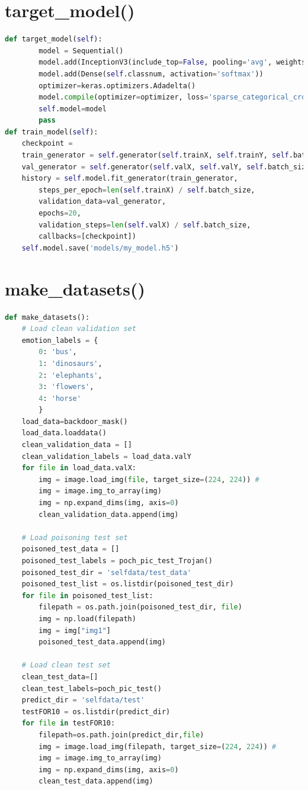 \documentclass[english,version-2022-01]{uzl-thesis}
\begin{document}
\section{target\_model()}
\label{target_model()}
\begin{lstlisting}[language=Python]
def target_model(self):
        model = Sequential()
        model.add(InceptionV3(include_top=False, pooling='avg', weights='imagenet'))
        model.add(Dense(self.classnum, activation='softmax'))
        optimizer=keras.optimizers.Adadelta()
        model.compile(optimizer=optimizer, loss='sparse_categorical_crossentropy', metrics=['accuracy'])
        self.model=model
        pass
def train_model(self):
    checkpoint = 
    train_generator = self.generator(self.trainX, self.trainY, self.batch_size, train_action=True)
    val_generator = self.generator(self.valX, self.valY, self.batch_size, train_action=False)
    history = self.model.fit_generator(train_generator,
        steps_per_epoch=len(self.trainX) / self.batch_size,
        validation_data=val_generator,
        epochs=20,
        validation_steps=len(self.valX) / self.batch_size,
        callbacks=[checkpoint])
    self.model.save('models/my_model.h5')
\end{lstlisting}

\section{make\_datasets()}
\label{make_datasets()}
\begin{lstlisting}[language=Python]
def make_datasets():
    # Load clean validation set
    emotion_labels = {
        0: 'bus',
        1: 'dinosaurs',
        2: 'elephants',
        3: 'flowers',
        4: 'horse'
        }
    load_data=backdoor_mask()
    load_data.loaddata()
    clean_validation_data = []
    clean_validation_labels = load_data.valY
    for file in load_data.valX:
        img = image.load_img(file, target_size=(224, 224)) #
        img = image.img_to_array(img) 
        img = np.expand_dims(img, axis=0)
        clean_validation_data.append(img)

    # Load poisoning test set
    poisoned_test_data = []
    poisoned_test_labels = poch_pic_test_Trojan()
    poisoned_test_dir = 'selfdata/test_data'
    poisoned_test_list = os.listdir(poisoned_test_dir)
    for file in poisoned_test_list:
        filepath = os.path.join(poisoned_test_dir, file)
        img = np.load(filepath) 
        img = img["img1"]
        poisoned_test_data.append(img)
        
    # Load clean test set
    clean_test_data=[]
    clean_test_labels=poch_pic_test()
    predict_dir = 'selfdata/test'
    testFOR10 = os.listdir(predict_dir)
    for file in testFOR10:
        filepath=os.path.join(predict_dir,file)
        img = image.load_img(filepath, target_size=(224, 224)) #
        img = image.img_to_array(img)  
        img = np.expand_dims(img, axis=0)
        clean_test_data.append(img)
\end{lstlisting}
\end{document}
